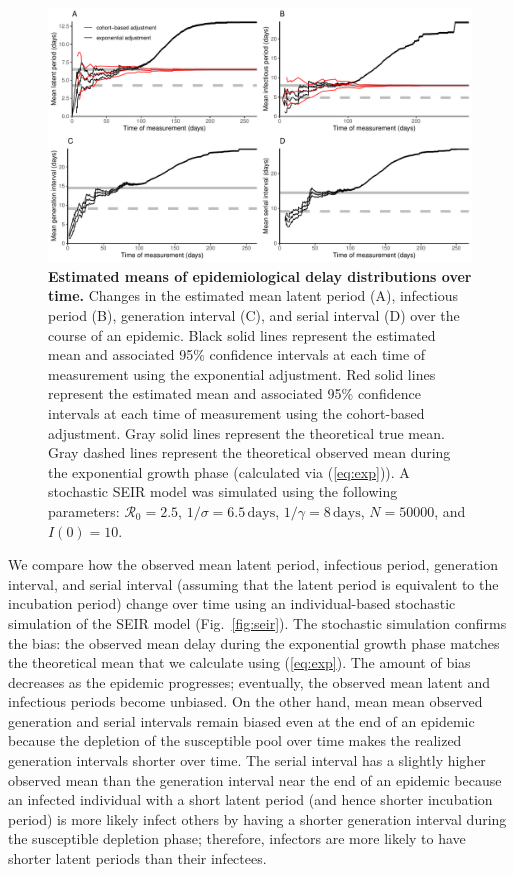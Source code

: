 \documentclass[12pt]{article}
\newcommand{\eref}[1]{(\ref{eq:#1})}
\newcommand{\fref}[1]{Fig.~\ref{fig:#1}}
\begin{document}
\begin{figure}[!th]
\includegraphics[width=\textwidth]{figure_seir2.pdf}
\caption{
\textbf{Estimated means of epidemiological delay distributions over time.}
Changes in the estimated mean latent period (A), infectious period (B), generation interval (C), and serial interval (D) over the course of an epidemic.
Black solid lines represent the estimated mean and associated 95\% confidence intervals at each time of measurement using the exponential adjustment.
Red solid lines represent the estimated mean and associated 95\% confidence intervals at each time of measurement using the cohort-based adjustment.
Gray solid lines represent the theoretical true mean.
Gray dashed lines represent the theoretical observed mean during the exponential growth phase (calculated via \eref{exp}).
A stochastic SEIR model was simulated using the following parameters: $\mathcal R_0 = 2.5$, $1/\sigma = 6.5\,\textrm{days}$, $1/\gamma = 8\,\textrm{days}$, $N=50000$, and $I(0)=10$.
}
\label{fig:seir2}
\end{figure}

We compare how the observed mean latent period, infectious period, generation interval, and serial interval (assuming that the latent period is equivalent to the incubation period) change over time using an individual-based stochastic simulation of the SEIR model (\fref{seir}).
The stochastic simulation confirms the bias: the observed mean delay during the exponential growth phase matches the theoretical mean that we calculate using \eref{exp}.
The amount of bias decreases as the epidemic progresses;
eventually, the observed mean latent and infectious periods become unbiased.
On the other hand, mean mean observed generation and serial intervals remain biased even at the end of an epidemic because the depletion of the susceptible pool over time makes the realized generation intervals shorter over time.
The serial interval has a slightly higher observed mean than the generation interval near the end of an epidemic because an infected individual with a short latent period (and hence shorter incubation period) is more likely infect others by having a shorter generation interval during the susceptible depletion phase; therefore, infectors are more likely to have shorter latent periods than their infectees.
\end{document}
